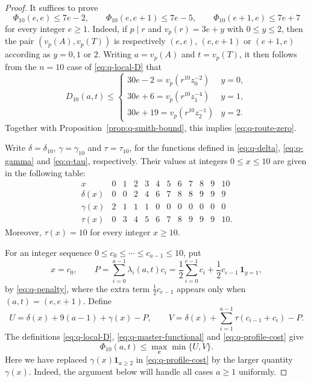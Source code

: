 \documentclass[a4paper,11pt, twoside,reqno]{amsart}
\theoremstyle{plain}
\theoremstyle{definition}
\theoremstyle{remark}
\newcommand{\bfc}{\bm{c}}
\renewcommand{\le}{\leqslant}
\renewcommand{\ge}{\geqslant}
\numberwithin{equation}{section}
\begin{document}
\begin{proof}
It suffices to prove
\[
\Phi_{10}(e,e)\le 7e-2,\qquad
\Phi_{10}(e,e+1)\le 7e-5,\qquad
\Phi_{10}(e+1,e)\le 7e+7
\]
for every integer $e\ge1$.
Indeed, if $p\mid r$
and $v_p(r)=3e+y$ with $0\le y\le 2$,
then the pair
$(v_p(A),v_p(T))$ is respectively
$(e,e)$, $(e,e+1)$ or $(e+1,e)$ according as
$y=0,1$ or $2$.
Writing $a=v_p(A)$ and $t=v_p(T)$,
it then follows from the $n=10$ case of \eqref{eq:q-local-D} that
\begin{equation*}
D_{10}(a,t) \le
\begin{cases}
30e-2 = v_p(r^{10}z_0^{-2})&y=0,\\
30e+6 = v_p(r^{10}z_1^{-4})&y=1,\\
30e+19 = v_p(r^{10}z_2^{-1})&y=2.
\end{cases}
\end{equation*}
Together with Proposition~\ref{prop:q-smith-bound},
this implies \eqref{eq:q-route-zero}.


Write $\delta=\delta_{10}$, $\gamma=\gamma_{10}$ and
$\tau=\tau_{10}$,
for the functions defined in \eqref{eq:q-delta}, \eqref{eq:q-gamma} and
\eqref{eq:q-tau}, respectively.
Their values at integers $0\le x\le 10$ are given in the following table:
\[
\begin{array}{c|*{11}{c}}
x         & 0 & 1 & 2 & 3 & 4 & 5 & 6 & 7 & 8 & 9 & 10 \\ \hline
\delta(x) & 0 & 0 & 2 & 4 & 6 & 7 & 8 & 8 & 9 & 9 & 9  \\
\gamma(x) & 2 & 1 & 1 & 1 & 0 & 0 & 0 & 0 & 0 & 0 & 0  \\
\tau(x)   & 0 & 3 & 4 & 5 & 6 & 7 & 8 & 9 & 9 & 9 & 10.
\end{array}
\]
Moreover, $\tau(x)=10$ for every integer $x\ge 10$.

For an integer sequence $0\le c_0\le\cdots\le c_{a-1}\le10$, put
\[
x=c_0,\qquad
P=\sum_{i=0}^{a-1}\lambda_i(a,t)c_i
= \frac12\sum_{i=0}^{e-1}c_i
+ \frac12c_{e-1}\, \bm{1}_{y=1},
\]
by \eqref{eq:q-penalty},
where the extra term $\frac12c_{e-1}$ appears only when $(a,t)=(e,e+1)$.
Define
\[
U=\delta(x)+9(a-1)+\gamma(x)-P,\qquad
V=\delta(x)+\sum_{i=1}^{a-1}\tau(c_{i-1}+c_i)-P.
\]
The definitions \eqref{eq:q-local-D},
\eqref{eq:q-master-functional}
and \eqref{eq:q-profile-cost}
give
\[
\Phi_{10}(a,t)\le\max_{\bfc}\min\{U,V\}.
\]
Here we have replaced
$\gamma(x)\bm{1}_{a\ge2}$ in \eqref{eq:q-profile-cost}
by the larger quantity
$\gamma(x)$.
Indeed, the argument below will handle all cases $a\ge 1$ uniformly.


\end{proof}
\end{document}

